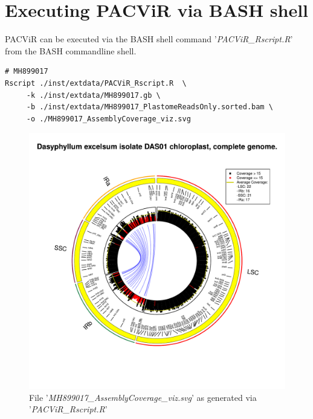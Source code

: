\documentclass[letterpaper]{article}
\begin{document}
\pagebreak

\section{Executing PACViR via BASH shell}
PACViR can be executed via the BASH shell command '\textit{PACViR\_Rscript.R}' from the BASH commandline shell.
  
\begin{footnotesize}
\begin{lstlisting}
# MH899017
Rscript ./inst/extdata/PACViR_Rscript.R  \
     -k ./inst/extdata/MH899017.gb \
     -b ./inst/extdata/MH899017_PlastomeReadsOnly.sorted.bam \
     -o ./MH899017_AssemblyCoverage_viz.svg
\end{lstlisting}
\end{footnotesize}

\begin{figure}[H]
\centering
    \includegraphics{MH899017_AssemblyCoverage_viz.pdf}
    \caption{File '\textit{MH899017\_AssemblyCoverage\_viz.svg}' as generated via '\textit{PACViR\_Rscript.R}'}
\centering
\end{figure}

\pagebreak

\end{document}
